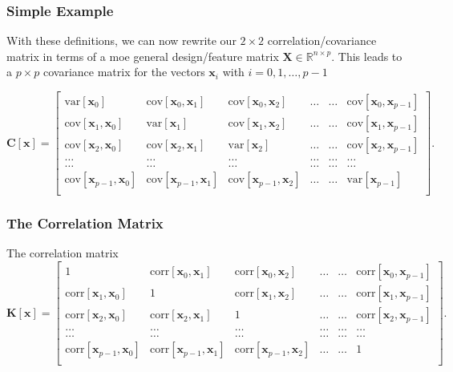 \documentclass{beamer}
\begin{document}
\begin{frame}
\frametitle{Simple Example}

With these definitions, we can now rewrite our $2\times 2$
correlation/covariance matrix in terms of a moe general design/feature
matrix $\bm{X}\in {\mathbb{R}}^{n\times p}$. This leads to a $p\times p$
covariance matrix for the vectors $\bm{x}_i$ with $i=0,1,\dots,p-1$

\[
\bm{C}[\bm{x}] = \begin{bmatrix}
\mathrm{var}[\bm{x}_0] & \mathrm{cov}[\bm{x}_0,\bm{x}_1]  & \mathrm{cov}[\bm{x}_0,\bm{x}_2] & \dots & \dots & \mathrm{cov}[\bm{x}_0,\bm{x}_{p-1}]\\
\mathrm{cov}[\bm{x}_1,\bm{x}_0] & \mathrm{var}[\bm{x}_1]  & \mathrm{cov}[\bm{x}_1,\bm{x}_2] & \dots & \dots & \mathrm{cov}[\bm{x}_1,\bm{x}_{p-1}]\\
\mathrm{cov}[\bm{x}_2,\bm{x}_0]   & \mathrm{cov}[\bm{x}_2,\bm{x}_1] & \mathrm{var}[\bm{x}_2] & \dots & \dots & \mathrm{cov}[\bm{x}_2,\bm{x}_{p-1}]\\
\dots & \dots & \dots & \dots & \dots & \dots \\
\dots & \dots & \dots & \dots & \dots & \dots \\
\mathrm{cov}[\bm{x}_{p-1},\bm{x}_0]   & \mathrm{cov}[\bm{x}_{p-1},\bm{x}_1] & \mathrm{cov}[\bm{x}_{p-1},\bm{x}_{2}]  & \dots & \dots  & \mathrm{var}[\bm{x}_{p-1}]\\
\end{bmatrix}.
\]
\end{frame}

\begin{frame}
\frametitle{The Correlation Matrix}

The correlation matrix
\[
\bm{K}[\bm{x}] = \begin{bmatrix}
1 & \mathrm{corr}[\bm{x}_0,\bm{x}_1]  & \mathrm{corr}[\bm{x}_0,\bm{x}_2] & \dots & \dots & \mathrm{corr}[\bm{x}_0,\bm{x}_{p-1}]\\
\mathrm{corr}[\bm{x}_1,\bm{x}_0] & 1  & \mathrm{corr}[\bm{x}_1,\bm{x}_2] & \dots & \dots & \mathrm{corr}[\bm{x}_1,\bm{x}_{p-1}]\\
\mathrm{corr}[\bm{x}_2,\bm{x}_0]   & \mathrm{corr}[\bm{x}_2,\bm{x}_1] & 1 & \dots & \dots & \mathrm{corr}[\bm{x}_2,\bm{x}_{p-1}]\\
\dots & \dots & \dots & \dots & \dots & \dots \\
\dots & \dots & \dots & \dots & \dots & \dots \\
\mathrm{corr}[\bm{x}_{p-1},\bm{x}_0]   & \mathrm{corr}[\bm{x}_{p-1},\bm{x}_1] & \mathrm{corr}[\bm{x}_{p-1},\bm{x}_{2}]  & \dots & \dots  & 1\\
\end{bmatrix}.
\]
\end{frame}
\end{document}
